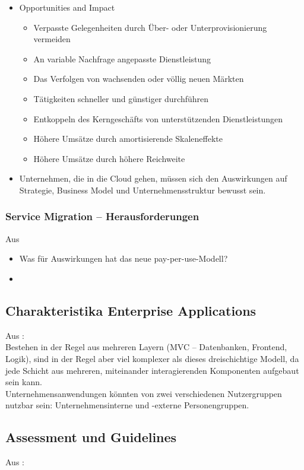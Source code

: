 \begin{itemize}
	\item Opportunities and Impact
	\begin{itemize}
		\item Verpasste Gelegenheiten durch Über- oder Unterprovisionierung vermeiden
		\item An variable Nachfrage angepasste Dienstleistung
		\item Das Verfolgen von wachsenden oder völlig neuen Märkten
		\item Tätigkeiten schneller und günstiger durchführen
		\item Entkoppeln des Kerngeschäfts von unterstützenden Dienstleistungen
		\item Höhere Umsätze durch amortisierende Skaleneffekte
		\item Höhere Umsätze durch höhere Reichweite
	\end{itemize}
	\item Unternehmen, die in die Cloud gehen, müssen sich den Auswirkungen auf Strategie, Business Model und Unternehmensstruktur bewusst sein.
\end{itemize}


\subsubsection{Service Migration -- Herausforderungen}
Aus 
\begin{itemize}
	\item Was für Auswirkungen hat das neue pay-per-use-Modell?
	\item
\end{itemize}

\subsection{Charakteristika Enterprise Applications}
Aus :\\
Bestehen in der Regel aus mehreren Layern (MVC -- Datenbanken, Frontend,
Logik), sind in der Regel aber viel komplexer als dieses dreischichtige Modell,
da jede Schicht aus mehreren, miteinander interagierenden Komponenten aufgebaut
sein kann. \\
Unternehmensanwendungen könnten von zwei verschiedenen Nutzergruppen nutzbar
sein: Unternehmensinterne und -externe Personengruppen.

\subsection{Assessment und Guidelines}
Aus : \\
